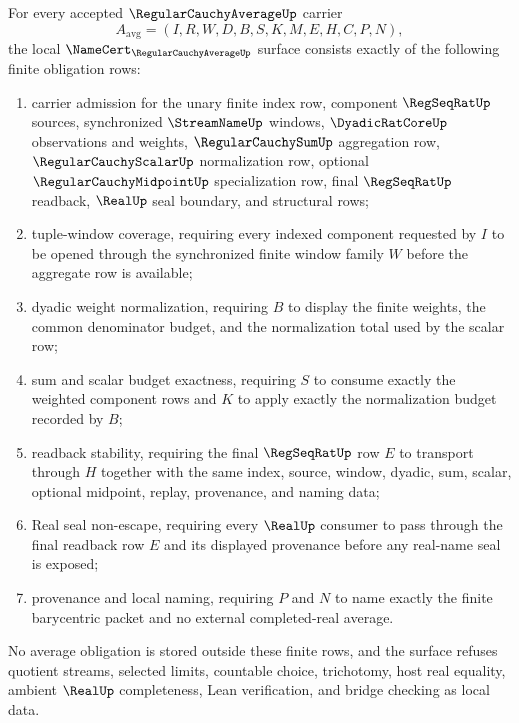 \begin{theorem}
\label{thm:regular-cauchy-average-namecert-obligations}
For every accepted $\RegularCauchyAverageUp$ carrier
$$
A_{\mathrm{avg}}=(I,R,W,D,B,S,K,M,E,H,C,P,N),
$$
the local $\NameCert_{\RegularCauchyAverageUp}$ surface consists exactly of the following finite obligation rows:
\begin{enumerate}
\item carrier admission for the unary finite index row, component $\RegSeqRatUp$ sources, synchronized $\StreamNameUp$ windows, $\DyadicRatCoreUp$ observations and weights, $\RegularCauchySumUp$ aggregation row, $\RegularCauchyScalarUp$ normalization row, optional $\RegularCauchyMidpointUp$ specialization row, final $\RegSeqRatUp$ readback, $\RealUp$ seal boundary, and structural rows;
\item tuple-window coverage, requiring every indexed component requested by $I$ to be opened through the synchronized finite window family $W$ before the aggregate row is available;
\item dyadic weight normalization, requiring $B$ to display the finite weights, the common denominator budget, and the normalization total used by the scalar row;
\item sum and scalar budget exactness, requiring $S$ to consume exactly the weighted component rows and $K$ to apply exactly the normalization budget recorded by $B$;
\item readback stability, requiring the final $\RegSeqRatUp$ row $E$ to transport through $H$ together with the same index, source, window, dyadic, sum, scalar, optional midpoint, replay, provenance, and naming data;
\item Real seal non-escape, requiring every $\RealUp$ consumer to pass through the final readback row $E$ and its displayed provenance before any real-name seal is exposed;
\item provenance and local naming, requiring $P$ and $N$ to name exactly the finite barycentric packet and no external completed-real average.
\end{enumerate}
No average obligation is stored outside these finite rows, and the surface refuses quotient streams, selected limits, countable choice, trichotomy, host real equality, ambient $\RealUp$ completeness, Lean verification, and bridge checking as local data.
\end{theorem}
